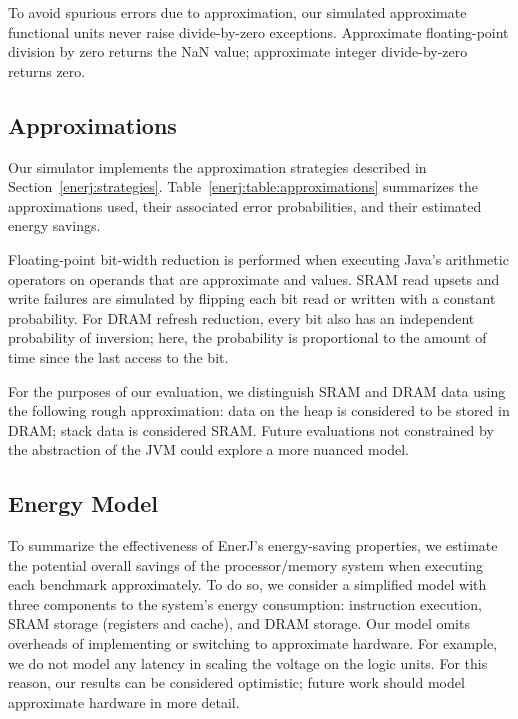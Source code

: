 To avoid spurious errors due to approximation, our simulated
approximate functional units never raise divide-by-zero exceptions. Approximate
floating-point division by zero returns the NaN value;
approximate integer divide-by-zero returns zero.



\subsection{Approximations}
Our simulator implements the approximation strategies described in
Section~\ref{enerj:strategies}. Table~\ref{enerj:table:approximations} summarizes the
approximations used, their associated error probabilities, and their
estimated energy savings.

Floating-point bit-width reduction is performed when executing Java's
arithmetic operators on operands that are approximate 
and  values. SRAM read upsets and write failures are
simulated by flipping each bit read or written with a constant
probability. For DRAM refresh reduction, every bit also has an
independent probability of inversion; here, the probability is
proportional to the amount of time since the last access to the bit.

For the purposes of our evaluation, we distinguish SRAM and DRAM data using the
following rough approximation: data on the heap is considered to be stored
in DRAM; stack data is considered SRAM\@. Future evaluations not constrained by
the abstraction of the JVM could explore a more nuanced model.

\subsection{Energy Model}
\label{enerj:energymodel}
To summarize the effectiveness of EnerJ's energy-saving properties, we estimate
the potential overall savings of the processor/memory system when executing
each benchmark approximately. To do so, we consider a simplified model with
three components to the system's energy consumption: instruction execution,
SRAM storage (registers and cache), and DRAM storage.
Our model omits overheads of implementing or switching to approximate hardware.
For example, we do not model any latency in scaling the voltage on the logic
units. For this reason, our results can be considered optimistic; future work
should model approximate hardware in more detail.

